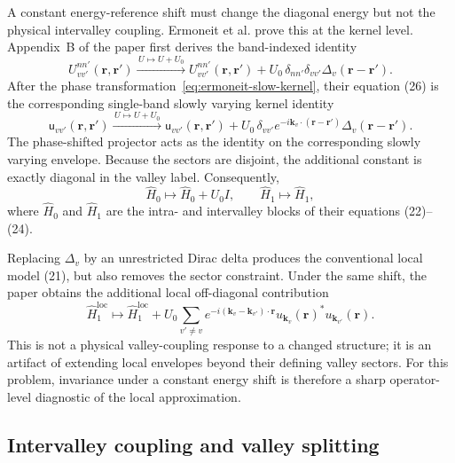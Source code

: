 A constant energy-reference shift must change the diagonal energy but not the
physical intervalley coupling. Ermoneit et al. prove this at the kernel level.
Appendix~B of the paper first derives the band-indexed identity
\begin{equation}
  U^{nn'}_{vv'}(\mathbf r,\mathbf r')
  \xrightarrow{\,U\mapsto U+U_0\,}
  U^{nn'}_{vv'}(\mathbf r,\mathbf r')
  +U_0\,\delta_{nn'}\delta_{vv'}
  \Delta_v(\mathbf r-\mathbf r').
  \label{eq:ermoneit-reference-shift-uppercase}
\end{equation}
After the phase transformation~\eqref{eq:ermoneit-slow-kernel}, their equation
(26) is the corresponding single-band slowly varying kernel identity
\begin{equation}
  \mathsf u_{vv'}(\mathbf r,\mathbf r')
  \xrightarrow{\,U\mapsto U+U_0\,}
  \mathsf u_{vv'}(\mathbf r,\mathbf r')
  +U_0\,\delta_{vv'}
  e^{-i\mathbf k_v\cdot(\mathbf r-\mathbf r')}
  \Delta_v(\mathbf r-\mathbf r').
  \label{eq:ermoneit-reference-shift}
\end{equation}
The phase-shifted projector acts as the identity on the corresponding slowly
varying envelope. Because the sectors are disjoint, the additional constant is
exactly diagonal in the valley label. Consequently,
\begin{equation}
  \hat H_0\mapsto\hat H_0+U_0 I,
  \qquad
  \hat H_1\mapsto\hat H_1,
  \label{eq:ermoneit-intravalley-intervalley-shift}
\end{equation}
where $\hat H_0$ and $\hat H_1$ are the intra- and intervalley blocks of their
equations (22)--(24).

Replacing $\Delta_v$ by an unrestricted Dirac delta produces the conventional
local model (21), but also removes the sector constraint. Under the same shift,
the paper obtains the additional local off-diagonal contribution
\begin{equation}
  \hat H_{1}^{\mathrm{loc}}
  \mapsto
  \hat H_{1}^{\mathrm{loc}}
  +U_0\sum_{v'\ne v}
  e^{-i(\mathbf k_v-\mathbf k_{v'})\cdot\mathbf r}
  u_{\mathbf k_v}(\mathbf r)^{*}
  u_{\mathbf k_{v'}}(\mathbf r).
  \label{eq:ermoneit-local-reference-artifact}
\end{equation}
This is not a physical valley-coupling response to a changed structure; it is an
artifact of extending local envelopes beyond their defining valley sectors.
For this problem, invariance under a constant energy shift is therefore a sharp
operator-level diagnostic of the local approximation.

\subsection{Intervalley coupling and valley splitting}

